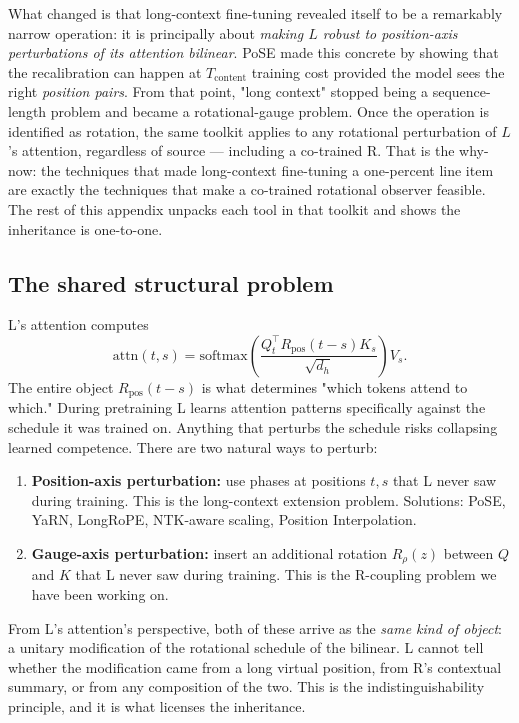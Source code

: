 \documentclass[10pt, twocolumn, a4paper]{article}
\begin{document}
What changed is that long-context fine-tuning revealed itself to be a remarkably narrow operation: it is principally about \emph{making $L$ robust to position-axis perturbations of its attention bilinear}. PoSE made this concrete by showing that the recalibration can happen at $T_{\text{content}}$ training cost provided the model sees the right \emph{position pairs}. From that point, "long context" stopped being a sequence-length problem and became a rotational-gauge problem. Once the operation is identified as rotation, the same toolkit applies to any rotational perturbation of $L$'s attention, regardless of source --- including a co-trained R. That is the why-now: the techniques that made long-context fine-tuning a one-percent line item are exactly the techniques that make a co-trained rotational observer feasible. The rest of this appendix unpacks each tool in that toolkit and shows the inheritance is one-to-one.

\subsection*{The shared structural problem}

L's attention computes
\[
\text{attn}(t, s) = \text{softmax}\!\left( \frac{Q_t^\top R_{\text{pos}}(t-s) K_s}{\sqrt{d_h}} \right) V_s.
\]
The entire object $R_{\text{pos}}(t-s)$ is what determines "which tokens attend to which." During pretraining L learns attention patterns specifically against the schedule it was trained on. Anything that perturbs the schedule risks collapsing learned competence. There are two natural ways to perturb:

\begin{enumerate}[nosep,leftmargin=1.5em]
\item \textbf{Position-axis perturbation:} use phases at positions $t, s$ that L never saw during training. This is the long-context extension problem. Solutions: PoSE, YaRN, LongRoPE, NTK-aware scaling, Position Interpolation.
\item \textbf{Gauge-axis perturbation:} insert an additional rotation $R_\rho(z)$ between $Q$ and $K$ that L never saw during training. This is the R-coupling problem we have been working on.
\end{enumerate}

From L's attention's perspective, both of these arrive as the \emph{same kind of object}: a unitary modification of the rotational schedule of the bilinear. L cannot tell whether the modification came from a long virtual position, from R's contextual summary, or from any composition of the two. This is the indistinguishability principle, and it is what licenses the inheritance.
\end{document}
